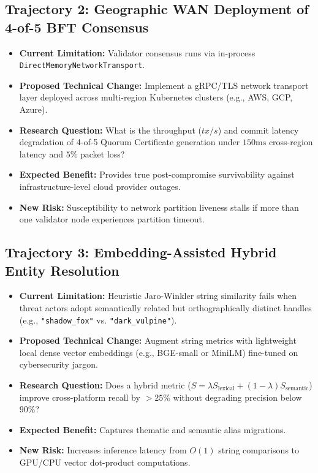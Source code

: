 \subsection{Trajectory 2: Geographic WAN Deployment of 4-of-5 BFT Consensus}
\begin{itemize}[noitemsep]
    \item \textbf{Current Limitation:} Validator consensus runs via in-process \texttt{DirectMemoryNetworkTransport}.
    \item \textbf{Proposed Technical Change:} Implement a gRPC/TLS network transport layer deployed across multi-region Kubernetes clusters (e.g., AWS, GCP, Azure).
    \item \textbf{Research Question:} What is the throughput ($tx/s$) and commit latency degradation of 4-of-5 Quorum Certificate generation under $150\text{ms}$ cross-region latency and $5\%$ packet loss?
    \item \textbf{Expected Benefit:} Provides true post-compromise survivability against infrastructure-level cloud provider outages.
    \item \textbf{New Risk:} Susceptibility to network partition liveness stalls if more than one validator node experiences partition timeout.
\end{itemize}

\subsection{Trajectory 3: Embedding-Assisted Hybrid Entity Resolution}
\begin{itemize}[noitemsep]
    \item \textbf{Current Limitation:} Heuristic Jaro-Winkler string similarity fails when threat actors adopt semantically related but orthographically distinct handles (e.g., \texttt{"shadow\_fox"} vs. \texttt{"dark\_vulpine"}).
    \item \textbf{Proposed Technical Change:} Augment string metrics with lightweight local dense vector embeddings (e.g., BGE-small or MiniLM) fine-tuned on cybersecurity jargon.
    \item \textbf{Research Question:} Does a hybrid metric ($S = \lambda S_{\text{lexical}} + (1-\lambda) S_{\text{semantic}}$) improve cross-platform recall by $>25\%$ without degrading precision below $90\%$?
    \item \textbf{Expected Benefit:} Captures thematic and semantic alias migrations.
    \item \textbf{New Risk:} Increases inference latency from $O(1)$ string comparisons to GPU/CPU vector dot-product computations.
\end{itemize}

